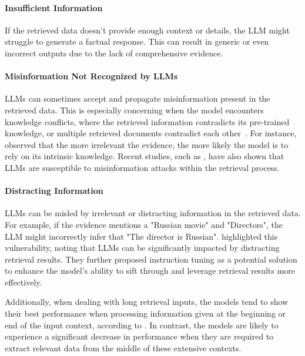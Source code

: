 \paragraph{Insufficient Information}
If the retrieved data doesn't provide enough context or details, the LLM might struggle to generate a factual response. This can result in generic or even incorrect outputs due to the lack of comprehensive evidence.

\paragraph{Misinformation Not Recognized by LLMs}
LLMs can sometimes accept and propagate misinformation present in the retrieved data. This is especially concerning when the model encounters knowledge conflicts, where the retrieved information contradicts its pre-trained knowledge, or multiple retrieved documents contradict each other~\cite{TruthDiscovery}. For instance, \cite{longpre2021entity} observed that the more irrelevant the evidence, the more likely the model is to rely on its intrinsic knowledge. Recent studies, such as \cite{pan2023risk}, have also shown that LLMs are susceptible to misinformation attacks within the retrieval process.

\paragraph{Distracting Information}
LLMs can be misled by irrelevant or distracting information in the retrieved data. For example, if the evidence mentions a "Russian movie" and "Directors", the LLM might incorrectly infer that "The director is Russian". \cite{luo2023sail} highlighted this vulnerability, noting that LLMs can be significantly impacted by distracting retrieval results. They further proposed instruction tuning as a potential solution to enhance the model's ability to sift through and leverage retrieval results more effectively.


Additionally, when dealing with long retrieval inputs, the models tend to show their best performance when processing information given at the beginning or end of the input context, according to \citet{liu2023lost}. In contrast, the models are likely to experience a significant decrease in performance when they are required to extract relevant data from the middle of these extensive contexts.

